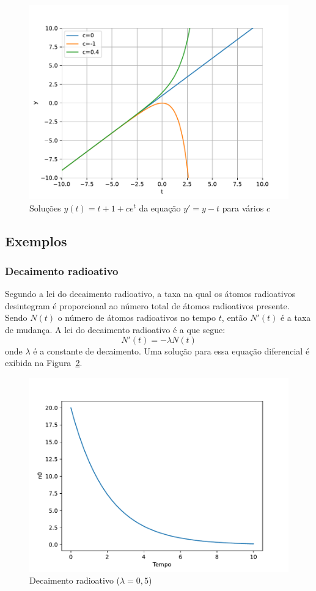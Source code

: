 \begin{figure}[tb]
	\centering
	\caption{Soluções $y(t) = t + 1 + ce^t$ da equação $y'=y-t$ para vários $c$}
	\label{fig:solucao}
	\includegraphics[width=0.7\linewidth]{figs/solucao}
\end{figure}


\subsection{Exemplos}
\subsubsection{Decaimento radioativo}
Segundo a lei do decaimento radioativo, a taxa na qual os átomos radioativos desintegram é proporcional ao número total de átomos radioativos presente. Sendo $N(t)$ o número de átomos radioativos no tempo $t$, então $N'(t)$ é a taxa de mudança. A lei do decaimento radioativo é a que segue:
\begin{equation}\label{eq:decaimento_radioativo}
	N'(t) = -\lambda N(t)
\end{equation}
onde $\lambda$ é a constante de decaimento. Uma solução para essa equação diferencial é exibida na Figura~\ref{fig:decaimento}.

\begin{figure}[tb]
	\centering
	\caption{Decaimento radioativo ($\lambda = 0,5$)}
	\label{fig:decaimento}
	\includegraphics[width=0.6\linewidth]{figs/decaimento}
\end{figure}

